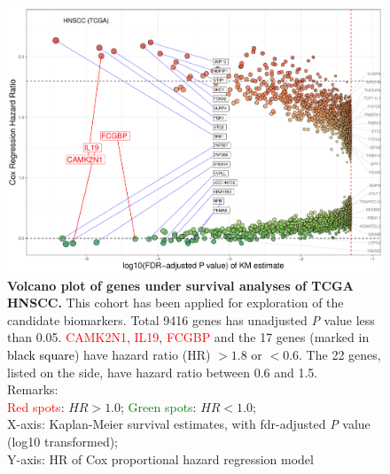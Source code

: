 \documentclass[preprint,12pt]{elsarticle}
\newcommand{\bcaption}[2]{\caption{\textbf{#1} #2}}
\newenvironment{MyColorPar}[1]{%
    \leavevmode\color{#1}\ignorespaces%
}{%
}%
\begin{document}
\begin{MyColorPar}{blue}
\begin{figure}
    \centering
    \includegraphics[width=13cm]{Rplot_TCGA_HNSCC_CoxHR_CAMK2N1_top3FDRKM.pdf}
    \bcaption{Volcano plot of genes under survival analyses of TCGA HNSCC.}{
    This cohort has been applied for exploration of the candidate biomarkers.
    Total 9416 genes has %
    unadjusted \textit{P} value less than 0.05.
    \textcolor{red}{CAMK2N1}, \textcolor{red}{IL19}, \textcolor{red}{FCGBP} and the 17 genes (marked in \textcolor{black}{black square}) have hazard ratio (HR) $> 1.8$ or $< 0.6$.
    The 22 genes, listed on the side, have hazard ratio between 0.6 and 1.5.\\
    Remarks:\\
    \textcolor{red}{Red spots}: $HR > 1.0$;
    \textcolor{green}{Green spots}: $HR < 1.0$;\\
    X-axis: Kaplan-Meier survival estimates, with \acrshort{fdr}-adjusted \textit{P} value (log10 transformed);\\
    Y-axis: HR of Cox proportional hazard regression model\\
    }
    \label{fig:hazards3}
\end{figure}



\end{MyColorPar}
\end{document}
